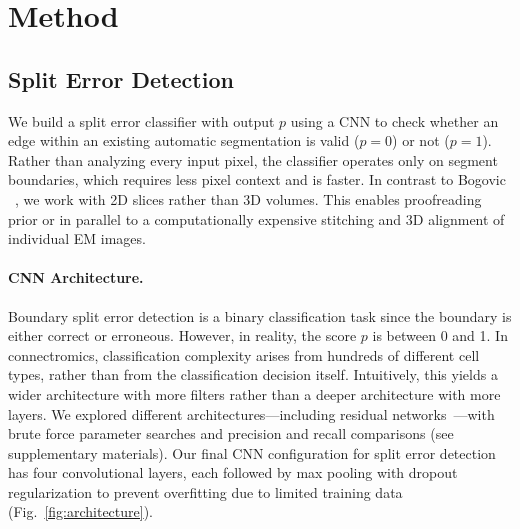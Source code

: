 

\section{Method}
\label{sec:methods}

\subsection{Split Error Detection}
\label{sec:spliterrordetection}

We build a split error classifier with output $p$ using a CNN to check whether an edge within an existing automatic segmentation is valid ($p=0$) or not ($p=1$). Rather than analyzing every input pixel, the classifier operates only on segment boundaries, which requires less pixel context and is faster. In contrast to Bogovic \etal~\cite{BogovicHJ13}, we work with 2D slices rather than 3D volumes. This enables proofreading prior or in parallel to a computationally expensive stitching and 3D alignment of individual EM images.

\paragraph{CNN Architecture.} Boundary split error detection is a binary classification task since the boundary is either correct or erroneous. However, in reality, the score $p$ is between 0 and 1. In connectromics, classification complexity arises from hundreds of different cell types, rather than from the classification decision itself. Intuitively, this yields a wider architecture with more filters rather than a deeper architecture with more layers. We explored different architectures---including residual networks~\cite{resnet}---with brute force parameter searches and precision and recall comparisons (see supplementary materials). Our final CNN configuration for split error detection has four convolutional layers, each followed by max pooling with dropout regularization to prevent overfitting due to limited training data (Fig.~\ref{fig:architecture}).

